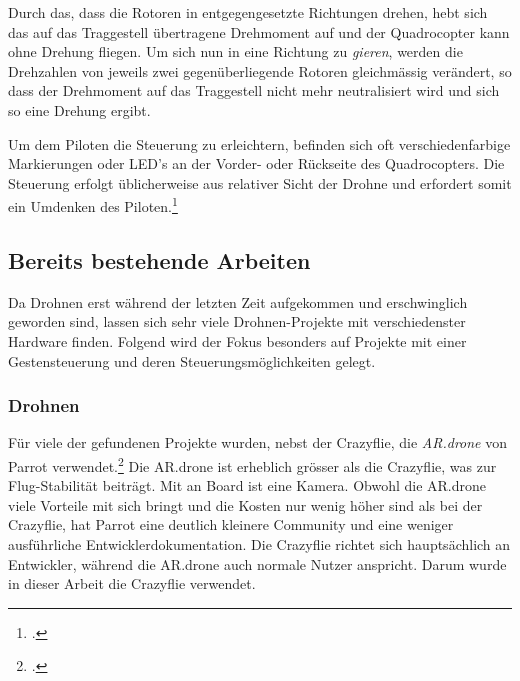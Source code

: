 Durch das, dass die Rotoren in entgegengesetzte Richtungen drehen, hebt sich das auf das Traggestell übertragene Drehmoment auf und der Quadrocopter kann ohne Drehung fliegen.
Um sich nun in eine Richtung zu \textit{gieren}, werden die Drehzahlen von jeweils zwei gegenüberliegende Rotoren gleichmässig verändert, so dass der Drehmoment auf das Traggestell nicht mehr neutralisiert wird und sich so eine Drehung ergibt.

Um dem Piloten die Steuerung zu erleichtern, befinden sich oft verschiedenfarbige Markierungen oder LED's an der Vorder- oder Rückseite des Quadrocopters.
Die Steuerung erfolgt üblicherweise aus relativer Sicht der Drohne und erfordert somit ein Umdenken des Piloten.\footcite{Quadrocopter__Wikipedia_2015-03-22}


\subsection{Bereits bestehende Arbeiten}
Da Drohnen erst während der letzten Zeit aufgekommen und erschwinglich geworden sind, lassen sich sehr viele Drohnen-Projekte mit verschiedenster Hardware finden.
Folgend wird der Fokus besonders auf Projekte mit einer Gestensteuerung und deren Steuerungsmöglichkeiten gelegt.


\subsubsection{Drohnen}
Für viele der gefundenen Projekte wurden, nebst der Crazyflie, die \textit{AR.drone} von Parrot verwendet.\footcite{AR_Drone_2.0_Parrot_2015-04-29}
Die AR.drone ist erheblich grösser als die Crazyflie, was zur Flug-Stabilität beiträgt. 
Mit an Board ist eine Kamera.
Obwohl die AR.drone viele Vorteile mit sich bringt und die Kosten nur wenig höher sind als bei der Crazyflie, hat Parrot eine deutlich kleinere Community und eine weniger ausführliche Entwicklerdokumentation.
Die Crazyflie richtet sich hauptsächlich an Entwickler, während die AR.drone auch normale Nutzer anspricht.
Darum wurde in dieser Arbeit die Crazyflie verwendet.

